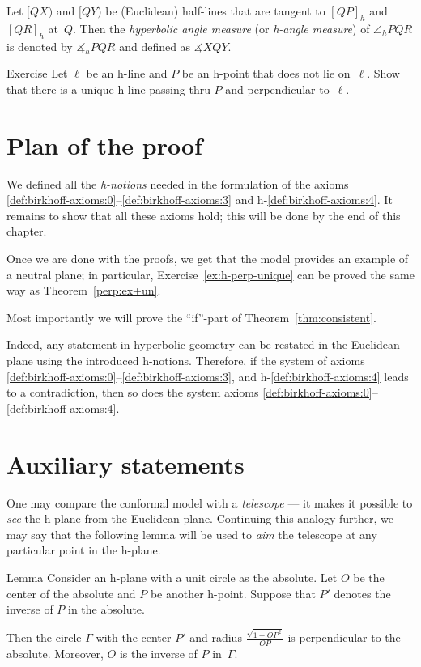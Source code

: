 Let $[QX)$ and $[QY)$ be (Euclidean) half-lines 
that are tangent to $[QP]_h$ and $[QR]_h$ 
at~$Q$.
Then the \emph{hyperbolic angle measure} (or \emph{h-angle measure}) of $\angle_h PQR$ is denoted by
$\measuredangle_h PQR$ and defined as
$\measuredangle XQY$.

\begin{thm}{Exercise}\label{ex:h-perp-unique}
Let $\ell$ be an h-line and $P$ be an h-point that does not lie on~$\ell$.
Show that there is a unique h-line passing thru $P$ 
and perpendicular to~$\ell$.
\end{thm}

\section{Plan of the proof}

We defined all the {}\emph{h-notions} needed in the formulation of the axioms \ref{def:birkhoff-axioms:0}--\ref{def:birkhoff-axioms:3} and h-\ref{def:birkhoff-axioms:4}.
It remains to show that all these axioms hold; 
this will be done by the end of this chapter.

Once we are done with the proofs, 
we get that the model provides an example of a neutral plane; 
in particular, Exercise~\ref{ex:h-perp-unique} can be proved the same way as Theorem~\ref{perp:ex+un}.

Most importantly we will prove the ``if''-part of Theorem~\ref{thm:consistent}.

Indeed, any statement in hyperbolic geometry can be restated in the Euclidean plane using the introduced h-notions.
Therefore, if the system of axioms \ref{def:birkhoff-axioms:0}--\ref{def:birkhoff-axioms:3}, and h-\ref{def:birkhoff-axioms:4} leads to a contradiction, then so does the system axioms \ref{def:birkhoff-axioms:0}--\ref{def:birkhoff-axioms:4}.

\section{Auxiliary statements}

One may compare the conformal model with a {}\emph{telescope} --- it makes it possible to {}\emph{see} the h-plane from the Euclidean plane.
Continuing this analogy further, we may say that the following lemma will be used to {}\emph{aim} the telescope at any particular point in the h-plane.

\begin{thm}{Lemma}\label{lem:P-->O} 
Consider an h-plane with a unit circle as the absolute.
Let $O$ be the center of the absolute and $P$ be another h-point.
Suppose that $P'$ denotes the inverse of $P$ in the absolute.

Then the circle $\Gamma$ with the center $P'$ and radius 
$\tfrac{\sqrt{1-OP^2}}{OP}$
is perpendicular to the absolute.
Moreover, $O$ is the inverse of $P$ in~$\Gamma$. 
\end{thm}

